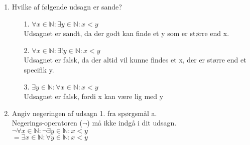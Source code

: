 
\begin{enumerate}[label=(\alph*)] 
\item Hvilke af følgende udsagn er sande?
\begin{enumerate}
\item[1.] $\forall x \in \mathbb{N}: \exists y \in \mathbb{N}: x<y$
\\ Udsagnet er sandt, da der godt kan finde et y som er større end x.
\item[2.] $\forall x \in \mathbb{N}:\exists!y \in \mathbb{N}: x<y$
\\ Udsagnet er falsk, da der altid vil kunne findes et x, der er større end et specifik y.
\item[3.] $\exists y \in \mathbb{N}: \forall x \in \mathbb{N}:x<y$
\\ Udsagnet er falsk, fordi x kan være lig med y
\end{enumerate}

\item Angiv negeringen af udsagn 1. fra spørgsmål a. 
\\ Negerings-operatoren ($\neg$) må ikke indgå i dit udsagn.
\\ $\neg\forall x \in \mathbb{N}: \neg\exists y \in \mathbb{N}: x<y$ 
\\$=\exists x \in \mathbb{N}: \forall y \in \mathbb{N}: x<y$
\end{enumerate}